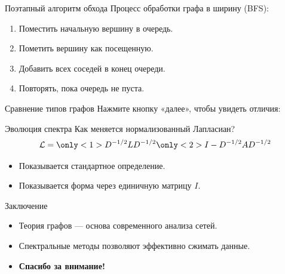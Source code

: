 \documentclass[10pt, aspectratio=169]{beamer}
\begin{document}
\begin{frame}{Поэтапный алгоритм обхода}
    Процесс обработки графа в ширину (BFS):
    \begin{enumerate}
        \item<1-> Поместить начальную вершину в очередь.
        \item<2-> Пометить вершину как посещенную.
        \item<3-> Добавить всех соседей в конец очереди.
        \item<4-> Повторять, пока очередь не пуста.
    \end{enumerate}
\end{frame}

\begin{frame}{Сравнение типов графов}
    Нажмите кнопку «далее», чтобы увидеть отличия:
    \vspace{0.5cm}
    
    \centering
\end{frame}

\begin{frame}{Эволюция спектра}
    Как меняется нормализованный Лапласиан?
    \vspace{1cm}
    \[
    \mathcal{L} = 
    \only<1>{D^{-1/2} L D^{-1/2}}
    \only<2>{I - D^{-1/2} A D^{-1/2}}
    \]
    \vspace{1cm}
    \begin{itemize}
        \item<1> Показывается стандартное определение.
        \item<2> Показывается форма через единичную матрицу $I$.
    \end{itemize}
\end{frame}

\begin{frame}{Заключение}
    \begin{itemize}
        \item Теория графов — основа современного анализа сетей.
        \item Спектральные методы позволяют эффективно сжимать данные.
        \item \textbf{Спасибо за внимание!}
    \end{itemize}
    \vspace{1cm}
\end{frame}
\end{document}
